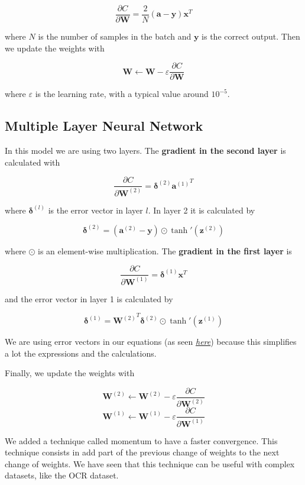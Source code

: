 \documentclass{article}
\begin{document}
$$\frac{\partial C}{\partial \mathbf{W}} = \frac{2}{N} \left ( \mathbf{a} - \mathbf{y} \right ) \mathbf{x}^T$$

where $N$ is the number of samples in the batch and $\mathbf{y}$ is the correct output. Then we update the weights with

$$\mathbf{W} \leftarrow \mathbf{W} - \varepsilon \frac{\partial C}{\partial \mathbf{W}}$$

where $\varepsilon$ is the learning rate, with a typical value around $10^{-5}$.


\subsection{Multiple Layer Neural Network}

In this model we are using two layers. The \textbf{gradient in the second layer} is calculated with

$$\frac{\partial C}{\partial \mathbf{W}^{(2)}} = \mathbf{\delta}^{(2)} {\mathbf{a}^{(1)}}^T$$

where $\mathbf{\delta}^{(l)}$ is the error vector in layer $l$. In layer 2 it is calculated by

$$\mathbf{\delta}^{(2)} = (\mathbf{a}^{(2)} - \mathbf{y}) \odot \tanh'\left (\mathbf{z}^{(2)} \right )$$

where $\odot$ is an element-wise multiplication. The \textbf{gradient in the first layer} is

$$\frac{\partial C}{\partial \mathbf{W}^{(1)}} = \mathbf{\delta}^{(1)} {\mathbf{x}}^T$$

and the error vector in layer 1 is calculated by

$$\mathbf{\delta}^{(1)} = {\mathbf{W}^{(2)}}^T\mathbf{\delta}^{(2)} \odot \tanh'\left (\mathbf{z}^{(1)} \right )$$

We are using error vectors in our equations (as seen \href{http://neuralnetworksanddeeplearning.com/}{\textit{here}}) because this simplifies a lot the expressions and the calculations. 

Finally, we update the weights with

$$\mathbf{W}^{(2)} \leftarrow \mathbf{W}^{(2)} - \varepsilon \frac{\partial C}{\partial \mathbf{W}^{(2)}}$$
$$\mathbf{W}^{(1)} \leftarrow \mathbf{W}^{(1)} - \varepsilon \frac{\partial C}{\partial \mathbf{W}^{(1)}}$$

We added a technique called momentum to have a faster convergence. This technique consists in add part of the previous change of weights to the next change of weights. We have seen that this technique can be useful with complex datasets, like the OCR dataset.
\end{document}
